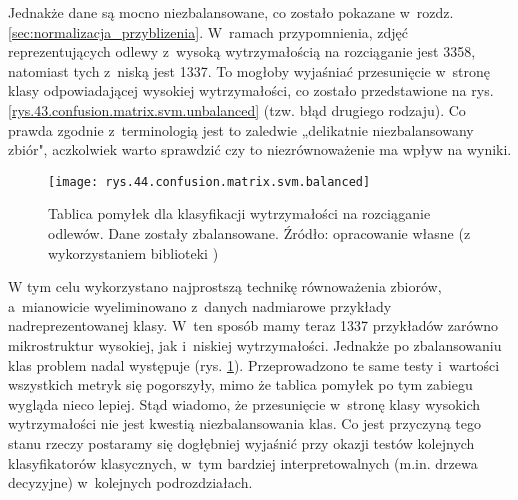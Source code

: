 Jednakże dane są mocno niezbalansowane, co zostało pokazane w~rozdz. \ref{sec:normalizacja_przyblizenia}. W~ramach przypomnienia, zdjęć reprezentujących odlewy z~wysoką wytrzymałością na rozciąganie jest 3358, natomiast tych z~niską jest 1337. To mogłoby wyjaśniać przesunięcie w~stronę klasy odpowiadającej wysokiej wytrzymałości, co zostało przedstawione na rys. \ref{rys.43.confusion.matrix.svm.unbalanced} (tzw. błąd drugiego rodzaju). Co prawda zgodnie z~terminologią jest to zaledwie „delikatnie niezbalansowany zbiór", aczkolwiek warto sprawdzić czy to niezrównoważenie ma wpływ na wyniki.
\begin{figure}[h]
    \centering
    \texttt{[image: rys.44.confusion.matrix.svm.balanced]}
    \caption{Tablica pomyłek dla klasyfikacji wytrzymałości na rozciąganie odlewów. Dane zostały zbalansowane. Źródło: opracowanie własne (z wykorzystaniem biblioteki )}
    \label{rys.44.confusion.matrix.svm.balanced}
\end{figure}
W tym celu wykorzystano najprostszą technikę równoważenia zbiorów, a~mianowicie wyeliminowano z~danych nadmiarowe przykłady nadreprezentowanej klasy. W~ten sposób mamy teraz 1337 przykładów zarówno mikrostruktur wysokiej, jak i~niskiej wytrzymałości. Jednakże po zbalansowaniu klas problem nadal występuje (rys. \ref{rys.44.confusion.matrix.svm.balanced}). Przeprowadzono te same testy i~wartości wszystkich metryk się pogorszyły, mimo że tablica pomyłek po tym zabiegu wygląda nieco lepiej. Stąd wiadomo, że przesunięcie w~stronę klasy wysokich wytrzymałości nie jest kwestią niezbalansowania klas. Co jest przyczyną tego stanu rzeczy postaramy się dogłębniej wyjaśnić przy okazji testów kolejnych klasyfikatorów klasycznych, w~tym bardziej interpretowalnych (m.in. drzewa decyzyjne) w~kolejnych podrozdziałach.

